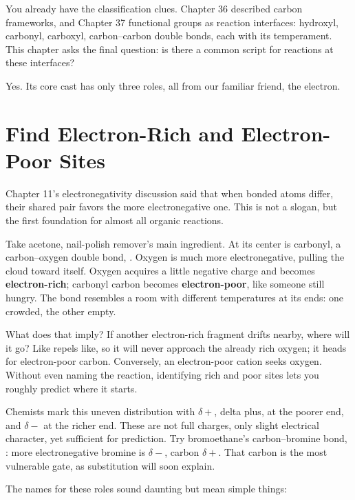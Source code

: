You already have the classification clues. Chapter 36 described carbon frameworks, and Chapter 37 functional groups as reaction interfaces: hydroxyl, carbonyl, carboxyl, carbon--carbon double bonds, each with its temperament. This chapter asks the final question: is there a common script for reactions at these interfaces?

Yes. Its core cast has only three roles, all from our familiar friend, the electron.

\section{Find Electron-Rich and Electron-Poor Sites}

Chapter 11's electronegativity discussion said that when bonded atoms differ, their shared pair favors the more electronegative one. This is not a slogan, but the first foundation for almost all organic reactions.

Take acetone, nail-polish remover's main ingredient. At its center is carbonyl, a carbon--oxygen double bond, . Oxygen is much more electronegative, pulling the cloud toward itself. Oxygen acquires a little negative charge and becomes \textbf{electron-rich}; carbonyl carbon becomes \textbf{electron-poor}, like someone still hungry. The bond resembles a room with different temperatures at its ends: one crowded, the other empty.

What does that imply? If another electron-rich fragment drifts nearby, where will it go? Like repels like, so it will never approach the already rich oxygen; it heads for electron-poor carbon. Conversely, an electron-poor cation seeks oxygen. Without even naming the reaction, identifying rich and poor sites lets you roughly predict where it starts.

Chemists mark this uneven distribution with $\delta+$, delta plus, at the poorer end, and $\delta-$ at the richer end. These are not full charges, only slight electrical character, yet sufficient for prediction. Try bromoethane's carbon--bromine bond, : more electronegative bromine is $\delta-$, carbon $\delta+$. That carbon is the most vulnerable gate, as substitution will soon explain.

The names for these roles sound daunting but mean simple things:

